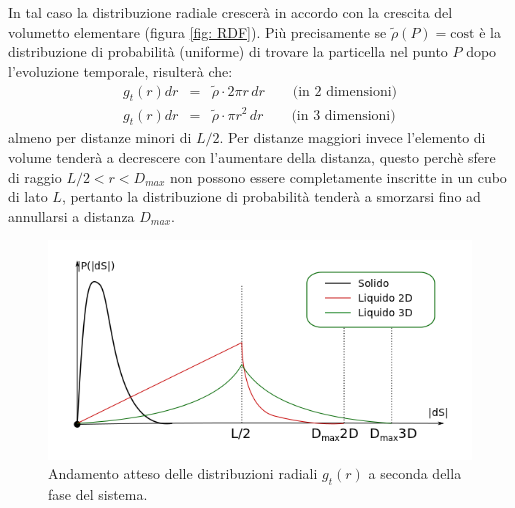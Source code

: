 \documentclass[11pt]{article}
\theoremstyle{plain}
\theoremstyle{remark}
\begin{document}
\begin{itemize}
In tal caso la distribuzione radiale crescerà in accordo con la crescita del volumetto elementare (figura \ref{fig: RDF}). Più precisamente se $\mathcal{\tilde{\rho}}(P)=\textrm{cost}$ è la distribuzione di probabilità (uniforme) di trovare la particella nel punto $P$ dopo l'evoluzione temporale, risulterà che:
\begin{eqnarray}
g_t(r) dr &=& \mathcal{\tilde{\rho}} \cdot 2\pi r\,dr   \qquad \textrm{(in 2 dimensioni)}    \nonumber \\
g_t(r) dr &=& \mathcal{\tilde{\rho}} \cdot \pi r^2\,dr   \qquad \textrm{(in 3 dimensioni)}    
\end{eqnarray}
almeno per distanze minori di $L/2$. 
Per distanze maggiori invece l'elemento di volume tenderà a decrescere con l'aumentare della distanza, questo perchè sfere di raggio $L/2<r<D_{max}$ non possono essere completamente inscritte in un cubo di lato $L$, pertanto la distribuzione di probabilità tenderà a smorzarsi fino ad annullarsi a distanza $D_{max}$.
\begin{figure}[h!]\vspace{-10pt}
     \begin{minipage}{0.6\textwidth}
		\begin{flushright}
		\includegraphics[scale=0.45]{Immagini/DistrodS.png}
		\end{flushright}
     \end{minipage}\hfill
     \begin{minipage}{0.4\textwidth}
     	\begin{flushleft}
			\caption[Distribuzione Radiale Attesa]{Andamento atteso delle distribuzioni radiali $g_t(r)$ a seconda della fase del sistema.}\label{fig: DistrodS}
     \end{flushleft}
     \end{minipage}\vspace{-15pt}
  \end{figure}
  

\end{itemize}
\end{document}

